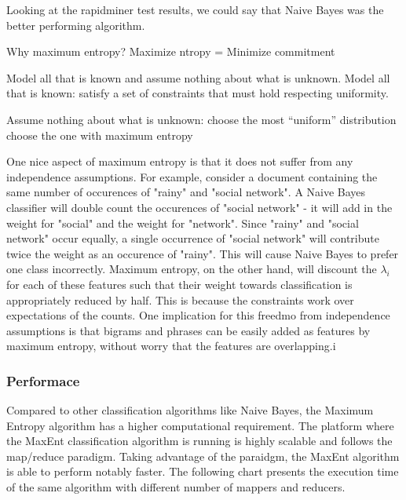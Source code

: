  
Looking at the rapidminer test results, we could say that Naive Bayes was the better performing algorithm. 

Why maximum entropy?
Maximize ntropy = Minimize commitment

Model all that is known and assume nothing about what is unknown. 
Model all that is known: satisfy a set of constraints that must hold respecting uniformity.

Assume nothing about what is unknown: 
   choose the most “uniform” distribution 
   choose the one with maximum entropy

One nice aspect of maximum entropy is that it does not suffer from any independence assumptions. For example, consider a document containing the same number of occurences of
"rainy" and "social network". A Naive Bayes classifier will double count the occurences of "social network" - it will add in the weight for "social" and the weight for "network". Since "rainy" and
"social network" occur equally, a single occurrence of "social network" will contribute twice the weight as an occurence of "rainy". This will cause Naive Bayes to prefer one class incorrectly.
Maximum entropy, on the other hand, will discount the $\lambda_i$ for each of these features such that their weight towards classification is appropriately reduced by half.
This is because the constraints work over expectations of the counts. One implication for this freedmo from independence assumptions is that bigrams and phrases can be easily added as features 
by maximum entropy, without worry that the features are overlapping.i


\subsubsection{Performace}
Compared to other classification algorithms like Naive Bayes, the Maximum Entropy algorithm has a higher computational requirement. 
The platform where the MaxEnt classification algorithm is running is highly scalable and follows the map/reduce paradigm. Taking advantage of the paraidgm, the MaxEnt algorithm
is able to perform notably faster.
The following chart presents the execution time of the same algorithm with different number of mappers and reducers.
